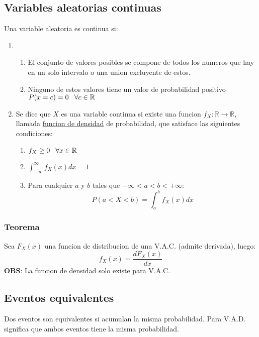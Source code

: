 \documentclass[titlepage,a4paper]{article}
\begin{document}
\subsection{Variables aleatorias continuas}
Una variable aleatoria es continua si:
\begin{enumerate}
    \item 
    \begin{enumerate}
        \item El conjunto de valores posibles se compone de todos los numeros que hay en un solo intervalo o una union excluyente de estos.
        \item Ninguno de estos valores tiene un valor de probabilidad positivo $P(x=c) = 0 \hspace{8px} \forall c \in \mathbb{R}$  
    \end{enumerate}
    \item Se dice que $X$ es una variable continua si existe una funcion $f_{X}: \mathbb{R} \to \mathbb{R}$, llamada \underline{funcion de densidad}
    de probabilidad, que satisface las siguientes condiciones:
    \begin{enumerate}
        \item $f_{X} \geq 0 \hspace{8px} \forall x \in \mathbb{R}$
        \item $\int_{-\infty}^{\infty} f_{X}(x) dx = 1$
        \item Para cualquier $a$ y $b$ tales que $-\infty < a<b< +\infty$:
        \begin{equation*}
            P(a<X<b) = \int_{a}^{b} f_{X}(x) dx
        \end{equation*}
    \end{enumerate}
\end{enumerate}

\subsubsection*{Teorema}
Sea $F_{X} (x)$ una funcion de distribucion de una V.A.C. (admite derivada), luego:
\begin{equation*}
    f_{X}(x) = \frac{dF_{X}(x)}{dx}
\end{equation*}
\textbf{OBS}: La funcion de densidad solo existe para V.A.C.

\subsection{Eventos equivalentes}
Dos eventos son equivalentes si acumulan la misma probabilidad. Para V.A.D. significa que ambos eventos tiene la misma probabilidad.
\end{document}

